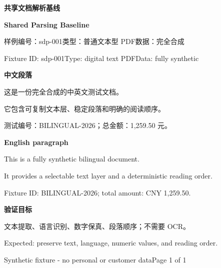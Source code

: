 \documentclass[11pt,a4paper]{article}
\begin{document}
\color{navy}
{\fontsize{20}{24}\selectfont\bfseries 共享文档解析基线}\par
{\fontsize{17}{21}\selectfont\bfseries Shared Parsing Baseline}\par
\vspace{3mm}{\color{blue}\rule{\textwidth}{2.2pt}}\par\vspace{5mm}
{\color{muted}\small 样例编号：sdp-001\quad 类型：普通文本型 PDF\quad 数据：完全合成}\par
{\color{muted}\footnotesize Fixture ID: sdp-001\quad Type: digital text PDF\quad Data: fully synthetic}
\vspace{7mm}
\begin{tcolorbox}[colback=bluebg,colframe=blue!30,boxrule=0pt,arc=2mm]
{\color{blue}\large\bfseries 中文段落}\par\vspace{3mm}
这是一份完全合成的中英文测试文档。\par\vspace{1.5mm}
它包含可复制文本层、稳定段落和明确的阅读顺序。\par\vspace{1.5mm}
测试编号：BILINGUAL-2026；总金额：1,259.50 元。
\end{tcolorbox}
\vspace{5mm}
\begin{tcolorbox}[colback=gray!6,colframe=gray!20,boxrule=0pt,arc=2mm]
{\color{blue}\large\bfseries English paragraph}\par\vspace{3mm}
This is a fully synthetic bilingual document.\par\vspace{1.5mm}
It provides a selectable text layer and a deterministic reading order.\par\vspace{1.5mm}
Fixture ID: BILINGUAL-2026; total amount: CNY 1,259.50.
\end{tcolorbox}
\vspace{5mm}
\begin{tcolorbox}[colback=greenbg,colframe=green!20,boxrule=0pt,arc=2mm]
{\color{green!70!black}\large\bfseries 验证目标}\par\vspace{3mm}
文本提取、语言识别、数字保真、段落顺序；不需要 OCR。\par\vspace{2mm}
\small Expected: preserve text, language, numeric values, and reading order.
\end{tcolorbox}
\vfill\color{muted}\scriptsize Synthetic fixture - no personal or customer data\hfill Page 1 of 1
\end{document}
